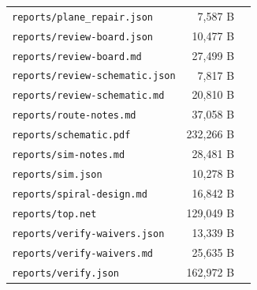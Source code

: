 \documentclass[11pt,a4paper]{article}
\begin{document}
{\begin{longtable}{p{9cm}rp{4cm}}
\texttt{reports/plane\_repair.json} & 7,587 B &  \\
\texttt{reports/review-board.json} & 10,477 B &  \\
\texttt{reports/review-board.md} & 27,499 B &  \\
\texttt{reports/review-schematic.json} & 7,817 B &  \\
\texttt{reports/review-schematic.md} & 20,810 B &  \\
\texttt{reports/route-notes.md} & 37,058 B &  \\
\texttt{reports/schematic.pdf} & 232,266 B &  \\
\texttt{reports/sim-notes.md} & 28,481 B &  \\
\texttt{reports/sim.json} & 10,278 B &  \\
\texttt{reports/spiral-design.md} & 16,842 B &  \\
\texttt{reports/top.net} & 129,049 B &  \\
\texttt{reports/verify-waivers.json} & 13,339 B &  \\
\texttt{reports/verify-waivers.md} & 25,635 B &  \\
\texttt{reports/verify.json} & 162,972 B &  \\
\bottomrule
\end{longtable}
}
\end{document}
